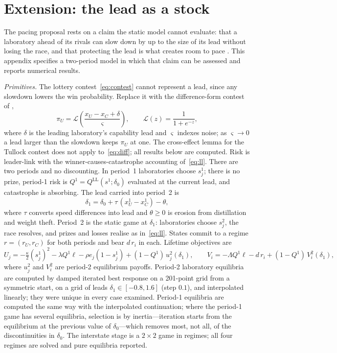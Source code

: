 \documentclass[11pt]{article}
\theoremstyle{plain}
\theoremstyle{definition}
\theoremstyle{remark}
\newcommand{\Lam}{\Lambda}
\begin{document}
\section{Extension: the lead as a stock}

The pacing proposal \citep{amodei2026} rests on a claim the static model cannot evaluate: that a laboratory ahead of its rivals can slow down by up to the size of its lead without losing the race, and that protecting the lead is what creates room to pace \citep{amodei2026}. This appendix specifies a two-period model in which that claim can be assessed and reports numerical results.

\emph{Primitives.} The lottery contest~\eqref{eq:contest} cannot represent a lead, since any slowdown lowers the win probability. Replace it with the difference-form contest of \citet{hirshleifer1989},
\begin{equation}
\pi_U=\mathcal L\!\left(\frac{x_U-x_C+\delta}{\varsigma}\right),\qquad \mathcal L(z)=\frac{1}{1+e^{-z}},
\label{eq:diff}
\end{equation}
where $\delta$ is the leading laboratory's capability lead and $\varsigma$ indexes noise; as $\varsigma\to0$ a lead larger than the slowdown keeps $\pi_U$ at one. The cross-effect lemma for the Tullock contest does not apply to~\eqref{eq:diff}; all results below are computed. Risk is leader-link with the winner-causes-catastrophe accounting of~\eqref{eq:ll}. There are two periods and no discounting. In period~1 laboratories choose $s^1_j$; there is no prize, period-1 risk is $Q^1=Q^{\mathrm{LL}}(s^1;\delta_0)$ evaluated at the current lead, and catastrophe is absorbing. The lead carried into period~2 is
\begin{equation}
\delta_1=\delta_0+\tau\,(x^1_U-x^1_C)-\theta,
\label{eq:leadlaw}
\end{equation}
where $\tau$ converts speed differences into lead and $\theta\ge0$ is erosion from distillation and weight theft. Period~2 is the static game at $\delta_1$: laboratories choose $s^2_j$, the race resolves, and prizes and losses realise as in~\eqref{eq:ll}. States commit to a regime $r=(r_U,r_C)$ for both periods and bear $d\,r_i$ in each. Lifetime objectives are
\[
U_j=-\tfrac{\kappa}{2}(s^1_j)^2-\lambda Q^1\ell-\rho e_j(1-s^1_j)+(1-Q^1)\,u^2_j(\delta_1),\qquad
V_i=-\Lam Q^1\ell-d\,r_i+(1-Q^1)\,V^2_i(\delta_1),
\]
where $u^2_j$ and $V^2_i$ are period-2 equilibrium payoffs. Period-2 laboratory equilibria are computed by damped iterated best response on a 201-point grid from a symmetric start, on a grid of leads $\delta_1\in[-0.8,1.6]$ (step $0.1$), and interpolated linearly; they were unique in every case examined. Period-1 equilibria are computed the same way with the interpolated continuation; where the period-1 game has several equilibria, selection is by inertia---iteration starts from the equilibrium at the previous value of $\delta_0$---which removes most, not all, of the discontinuities in $\delta_0$. The interstate stage is a $2\times2$ game in regimes; all four regimes are solved and pure equilibria reported.
\end{document}
